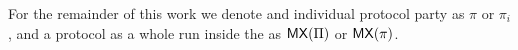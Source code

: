 For the remainder of this work we denote and individual protocol party as $\pi$ or $\pi_i$, and a protocol as a whole run inside the \partywrapper as $\mathsf{MX}(\Pi)$ or $\mathsf{MX}(\pi)$.

%

